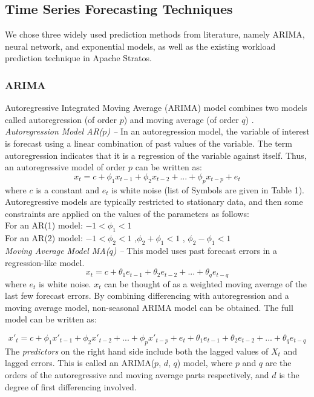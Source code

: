 \subsection{Time Series Forecasting Techniques}
We chose three widely used prediction methods from literature, namely ARIMA, neural network, and exponential models, as well as the existing workload prediction technique in Apache Stratos.

\subsubsection{ARIMA}
Autoregressive Integrated Moving Average (ARIMA) model combines two models called autoregression (of order $p$) and moving average (of order $q$) .\\

\noindent
\textit{Autoregression Model AR($p$) --}
In an autoregression model, the variable of interest is forecast using a linear combination of past values of the variable. The term autoregression indicates that it is a regression of the variable against itself. Thus, an autoregressive model of order $p$ can be written as:
	$$x_t = c + \phi_1x_{ t-1} + \phi_2x_{t-2} +...+ \phi_px_{t-p} + e_{t}$$
where $c$ is a constant and $e_t$ is white noise (list of Symbols are given in Table 1). Autoregressive models are typically restricted to stationary data, and then some constraints are applied on the values of the parameters \cite{Forecasting_OTexts} as follows: \\
    For an AR(1) model: $-1 < \phi_{1} < 1$ \\
    For an AR(2) model: $-1 < \phi_{2} < 1$ ,$\phi_{2}+ \phi_{1} < 1$ , $\phi_{2} - \phi_{1} < 1$ \\

\noindent
\textit{Moving Average Model MA($q$) --}
This model uses past forecast errors in a regression-like model.
	$$x_t =  c + \theta_1e_{ t-1} + \theta_2e_{t-2} +...+ \theta_qe_{t-q}$$
where $e_t$ is white noise. $x_t$ can be thought of as a weighted moving average of the last few forecast errors. 
By combining differencing with autoregression and a moving average model, non-seasonal ARIMA model can be obtained. The full model can be written as:

	$${x}'_t = c + \phi_1{x}'_{ t-1} + \phi_2{x}'_{t-2} +...+ \phi_p{x}'_{t-p} + e_{t} + \theta_1e_{ t-1} + \theta_2e_{t-2} +...+ \theta_qe_{t-q}$$
The \textit{predictors} on the right hand side include both the lagged values of $X_t$ and lagged errors. This is called an ARIMA($p$, $d$, $q$) model, where $p$ and $q$ are the orders of the autoregressive and moving average parts respectively, and $d$ is the degree of first differencing involved.

